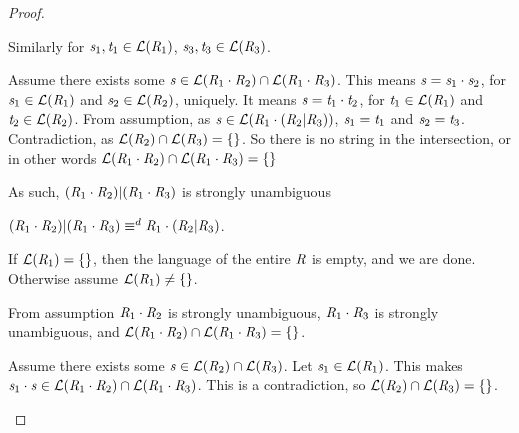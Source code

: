 \documentclass[numbers,10pt,preprint\ifanon ,nocopyrightspace\fi]{sigplanconf}
\begin{document}
\begin{proof}
\begin{case}
    Similarly for $\mathit{s}_1,\mathit{t}_1 \in \mathcal{L}(\mathit{R}_1)$,
    $\mathit{s}_3,\mathit{t}_3 \in \mathcal{L}(\mathit{R}_3)$.

    Assume there exists some $\mathit{s} \in \mathcal{L}(\mathit{R}_1 \cdot \mathit{R}_2)
    \cap
    \mathcal{L}(\mathit{R}_1 \cdot \mathit{R}_3)$.
    This means $\mathit{s} = \mathit{s}_1 \cdot \mathit{s}_2$, for
    $\mathit{s}_1\in\mathcal{L}(\mathit{R}_1)$ and $\mathit{s}_2\in\mathcal{L}(\mathit{R}_2)$,
    uniquely.
    It means $\mathit{s} = \mathit{t}_1 \cdot \mathit{t}_2$, for
    $\mathit{t}_1\in\mathcal{L}(\mathit{R}_1)$ and
    $\mathit{t}_2\in\mathcal{L}(\mathit{R}_2)$.
    From assumption, as
    $\mathit{s} \in \mathcal{L}(\mathit{R}_1 \cdot (\mathit{R}_2 | \mathit{R}_3))$,
    $\mathit{s}_1 = \mathit{t}_1$ and $\mathit{s}_2 = \mathit{t}_3$.
    Contradiction, as
    $\mathcal{L}(\mathit{R}_2) \cap \mathcal{L}(\mathit{R}_3) = \{\}$.
    So there is no string in the intersection, or in other words
    $\mathcal{L}(\mathit{R}_1 \cdot \mathit{R}_2)
    \cap
    \mathcal{L}(\mathit{R}_1 \cdot \mathit{R}_3) = \{\}$

    As such, $(\mathit{R}_1 \cdot \mathit{R}_2) | (\mathit{R}_1 \cdot \mathit{R}_3)$ is
    strongly unambiguous
  \end{case}

  \begin{case}
    $(\mathit{R}_1 \cdot \mathit{R}_2) | (\mathit{R}_1 \cdot \mathit{R}_3)
    \equiv^d \mathit{R}_1 \cdot (\mathit{R}_2 | \mathit{R}_3)$.

    If $\mathcal{L}(\mathit{R}_1) = \{\}$, then the language of the entire
    $\mathit{R}$ is empty, and we are done.  Otherwise assume
    $\mathcal{L}(\mathit{R}_1) \neq \{\}$.

    From assumption $\mathit{R}_1 \cdot \mathit{R}_2$ is strongly unambiguous,
    $\mathit{R}_1 \cdot \mathit{R}_3$ is strongly unambiguous,
    and $\mathcal{L}(\mathit{R}_1 \cdot \mathit{R}_2) \cap
    \mathcal{L}(\mathit{R}_1 \cdot \mathit{R}_3) = \{\}$.
    
    Assume there exists some
    $\mathit{s} \in \mathcal{L}(\mathit{R}_2) \cap \mathcal{L}(\mathit{R}_3)$.
    Let $\mathit{s}_1 \in \mathcal{L}(\mathit{R}_1)$.
    This makes
    $\mathit{s}_1\cdot\mathit{s} \in \mathcal{L}(\mathit{R}_1 \cdot \mathit{R}_2)
    \cap \mathcal{L}(\mathit{R}_1 \cdot \mathit{R}_3)$.  This is a
    contradiction, so
    $\mathcal{L}(\mathit{R}_2) \cap \mathcal{L}(\mathit{R}_3) = \{\}$.


\end{case}
\end{proof}
\end{document}
